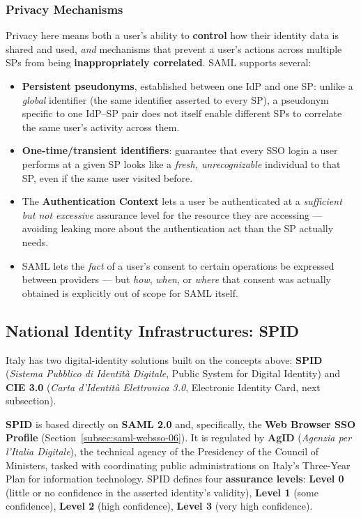 \documentclass[12pt, a4paper]{article}
\begin{document}
\subsubsection{Privacy Mechanisms}
Privacy here means both a user's ability to \textbf{control} how their identity data is shared and used, \emph{and} mechanisms that prevent a user's actions across multiple SPs from being \textbf{inappropriately correlated}. SAML supports several:
\begin{itemize}
    \item \textbf{Persistent pseudonyms}, established between one IdP and one SP: unlike a \emph{global} identifier (the same identifier asserted to every SP), a pseudonym specific to one IdP--SP pair does not itself enable different SPs to correlate the same user's activity across them.
    \item \textbf{One-time/transient identifiers}: guarantee that every SSO login a user performs at a given SP looks like a \emph{fresh, unrecognizable} individual to that SP, even if the same user visited before.
    \item The \textbf{Authentication Context} lets a user be authenticated at a \emph{sufficient but not excessive} assurance level for the resource they are accessing --- avoiding leaking more about the authentication act than the SP actually needs.
    \item SAML lets the \emph{fact} of a user's consent to certain operations be expressed between providers --- but \emph{how}, \emph{when}, or \emph{where} that consent was actually obtained is explicitly out of scope for SAML itself.
\end{itemize}

\subsection{National Identity Infrastructures: SPID}
\label{subsec:spid-06}
Italy has two digital-identity solutions built on the concepts above: \textbf{SPID} (\textit{Sistema Pubblico di Identità Digitale}, Public System for Digital Identity) and \textbf{CIE 3.0} (\textit{Carta d'Identità Elettronica 3.0}, Electronic Identity Card, next subsection).

\textbf{SPID} is based directly on \textbf{SAML 2.0} and, specifically, the \textbf{Web Browser SSO Profile} (Section~\ref{subsec:saml-websso-06}). It is regulated by \textbf{AgID} (\textit{Agenzia per l'Italia Digitale}), the technical agency of the Presidency of the Council of Ministers, tasked with coordinating public administrations on Italy's Three-Year Plan for information technology. SPID defines four \textbf{assurance levels}: \textbf{Level 0} (little or no confidence in the asserted identity's validity), \textbf{Level 1} (some confidence), \textbf{Level 2} (high confidence), \textbf{Level 3} (very high confidence).
\end{document}
